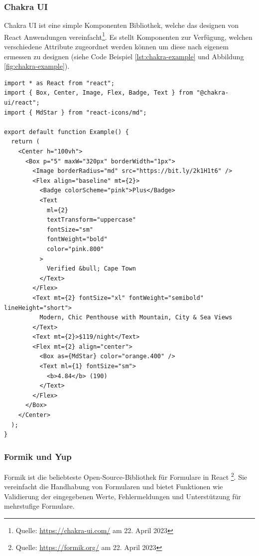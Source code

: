 \documentclass[a4paper,12pt]{report}
\begin{document}
        \subsubsection{Chakra UI}
        \label{sec:chakraUI}
Chakra UI ist eine simple Komponenten Bibliothek, welche das designen von React Anwendungen vereinfacht\footnote{Quelle: \url{https://chakra-ui.com/} am 22. April 2023}. Es stellt Komponenten zur Verfügung, welchen verschiedene Attribute zugeordnet werden können um diese nach eigenem ermessen zu designen (siehe Code Beispiel \ref{lst:chakra-example} und Abbildung \ref{fig:chakra-example}).

\begin{lstlisting}[style=codeStyle, caption={Beispiel mit Chakra UI designten React Komponente (siehe Abbildung  \textbf{Quelle: } \cite{chakraui}}, label={lst:chakra-example}]
import * as React from "react";
import { Box, Center, Image, Flex, Badge, Text } from "@chakra-ui/react";
import { MdStar } from "react-icons/md";

export default function Example() {
  return (
    <Center h="100vh">
      <Box p="5" maxW="320px" borderWidth="1px">
        <Image borderRadius="md" src="https://bit.ly/2k1H1t6" />
        <Flex align="baseline" mt={2}>
          <Badge colorScheme="pink">Plus</Badge>
          <Text
            ml={2}
            textTransform="uppercase"
            fontSize="sm"
            fontWeight="bold"
            color="pink.800"
          >
            Verified &bull; Cape Town
          </Text>
        </Flex>
        <Text mt={2} fontSize="xl" fontWeight="semibold" lineHeight="short">
          Modern, Chic Penthouse with Mountain, City & Sea Views
        </Text>
        <Text mt={2}>$119/night</Text>
        <Flex mt={2} align="center">
          <Box as={MdStar} color="orange.400" />
          <Text ml={1} fontSize="sm">
            <b>4.84</b> (190)
          </Text>
        </Flex>
      </Box>
    </Center>
  );
}
\end{lstlisting}
        \subsubsection{Formik und Yup}
        \label{sec:formik}
Formik ist die beliebteste Open-Source-Bibliothek für Formulare in React \footnote{Quelle: \url{https://formik.org/} am 22. April 2023}. Sie vereinfacht die Handhabung von Formularen und bietet Funktionen wie Validierung der eingegebenen Werte, Fehlermeldungen und Unterstützung für mehrstufige Formulare.
\end{document}
